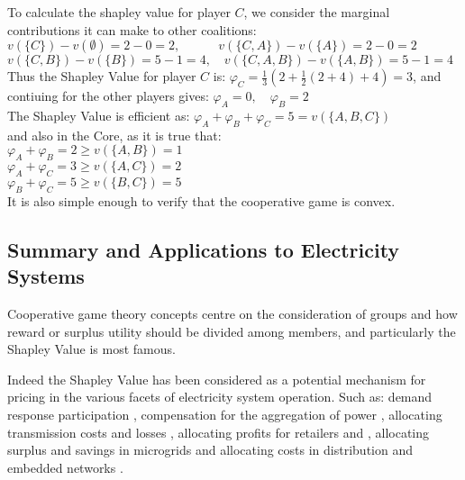 \begin{solution}
To calculate the shapley value for player $C$, we consider the marginal contributions it can make to other coalitions:\\
$ v(\{C\})-v(\emptyset) = 2-0 = 2, \quad\quad\quad v(\{C,A\})-v(\{A\}) = 2-0 = 2$\\
$ v(\{C,B\})-v(\{B\}) = 5-1 = 4, \quad v(\{C,A,B\})-v(\{A,B\}) = 5-1 = 4  $\\
Thus the Shapley Value for player $C$ is:
$\varphi_C = \frac{1}{3}\left(2 + \frac{1}{2}(2+4) + 4\right) = 3$, and contiuing for the other players gives:
$\varphi_A = 0,\quad\varphi_B = 2$\\
The Shapley Value is efficient as: $\varphi_A+\varphi_B+\varphi_C = 5 = v(\{A,B,C\})$\\
and also in the Core, as it is true that:\\
$\varphi_A+\varphi_B=2\ge v(\{A,B\})=1$\\
$\varphi_A+\varphi_C=3\ge v(\{A,C\})=2$\\
$\varphi_B+\varphi_C=5\ge v(\{B,C\})=5$\\
It is also simple enough to verify that the cooperative game is convex.

\end{solution}

\subsection{Summary and Applications to Electricity Systems}

Cooperative game theory concepts centre on the consideration of groups and how reward or surplus utility should be divided among members, and particularly the Shapley Value is most famous.

Indeed the Shapley Value has been considered as a potential mechanism for pricing in the various facets of electricity system operation.
Such as: demand response participation \cite{DBLP:journals/tsg/OBrienGR15,electronics8010048,WANG201972}, compensation for the aggregation of power \cite{Perez-Diaz:2018:CEV:3237383.3237484,6520960}, allocating transmission costs and losses \cite{ip-gtd_20020005,SHARMA201733}, allocating profits for retailers and \cite{ACUNA2018161,WANG201972}, allocating surplus and savings in microgrids \cite{WU2017384} and allocating costs in distribution and embedded networks \cite{archie_paper1,8226810,10.1007/978-3-642-40776-5_19,6840296,DBLP:journals/corr/abs-1903-10965,AzuatalamCV_PowerTech2019}.

